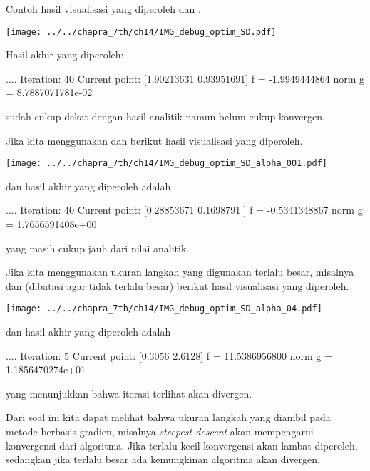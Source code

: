 Contoh hasil visualisasi yang diperoleh 
dan .

{\centering
\texttt{[image: ../../chapra\_7th/ch14/IMG\_debug\_optim\_SD.pdf]}
\par}

Hasil akhir yang diperoleh:
\begin{pythoncode}
....
Iteration:  40
Current point:  [1.90213631 0.93951691]
f      =      -1.9949444864
norm g =   8.7887071781e-02
\end{pythoncode}
sudah cukup dekat dengan hasil analitik namun belum cukup konvergen.

Jika kita menggunakan  dan 
berikut hasil visualisasi yang diperoleh.

{\centering
\texttt{[image: ../../chapra\_7th/ch14/IMG\_debug\_optim\_SD\_alpha\_001.pdf]}
\par}
dan hasil akhir yang diperoleh adalah
\begin{textcode}
....
Iteration:  40
Current point:  [0.28853671 0.1698791 ]
f      =      -0.5341348867
norm g =   1.7656591408e+00
\end{textcode}
yang masih cukup jauh dari nilai analitik.


Jika kita menggunakan ukuran langkah yang digunakan terlalu besar,
misalnya  dan  (dibatasi agar tidak
terlalu besar)
berikut hasil visualisasi yang diperoleh.

{\centering
\texttt{[image: ../../chapra\_7th/ch14/IMG\_debug\_optim\_SD\_alpha\_04.pdf]}
\par}

dan hasil akhir yang diperoleh adalah
\begin{textcode}
....
Iteration:  5
Current point:  [0.3056 2.6128]
f      =      11.5386956800
norm g =   1.1856470274e+01
\end{textcode}
yang menunjukkan bahwa iterasi terlihat akan divergen.

Dari soal ini kita dapat melihat bahwa ukuran langkah yang diambil pada metode berbasis gradien,
misalnya \textit{steepest descent} akan mempengarui konvergensi dari algoritma.
Jika terlalu kecil konvergensi akan lambat diperoleh, sedangkan jika terlalu besar ada kemungkinan
algoritma akan divergen.

